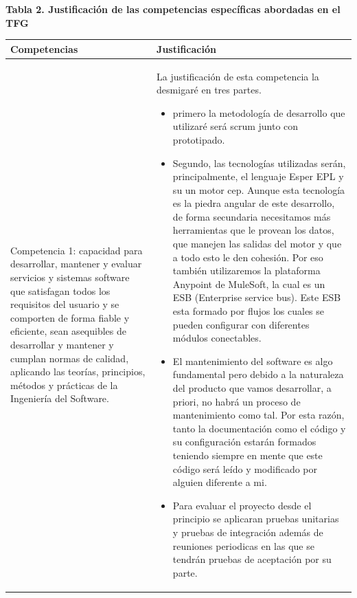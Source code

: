 \documentclass[a4paper]{article}
\begin{document}
\bigskip
{\centering\bfseries
Tabla 2. Justificaci\'on de las competencias espec\'ificas abordadas en el TFG
\par}
\begin{center}
  \begin{supertabular}{m{5.605cm}m{10.849cm}}

	{\color{black} \textbf{Competencias}} &
	{\color{black} \textbf{Justificaci\'on}}\\\hline
    
    {\color{black} Competencia 1: capacidad para desarrollar, mantener y evaluar servicios y sistemas software que satisfagan todos los requisitos del usuario y se comporten de forma fiable y eficiente, sean asequibles de desarrollar y mantener y cumplan normas de calidad, aplicando las teor\'ias, principios, m\'etodos y pr\'acticas de la Ingenier\'ia del Software.} &
    {\color{black} La justificación de esta competencia la desmigaré en tres partes.
    {\begin{itemize} 
    \item primero la metodología de desarrollo que utilizaré será scrum junto con prototipado.
    \item Segundo, las tecnologías utilizadas serán, principalmente, el lenguaje Esper EPL y su un motor cep. Aunque esta tecnología es la piedra angular de este desarrollo, de forma secundaria necesitamos más herramientas que le provean los datos, que manejen las salidas del motor y que a todo esto le den cohesión. Por eso también utilizaremos la plataforma Anypoint de MuleSoft, la cual es un ESB (Enterprise service bus). Este ESB esta formado por flujos los cuales se pueden configurar con diferentes módulos conectables.
    \item El mantenimiento del software es algo fundamental pero debido a la naturaleza del producto que vamos desarrollar, a priori, no habrá un proceso de mantenimiento como tal. Por esta razón, tanto la documentación como el código y su configuración estarán formados teniendo siempre en mente que este código será leído y modificado por alguien diferente a mi.
    \item Para evaluar el proyecto desde el principio se aplicaran pruebas unitarias y pruebas de integración además de reuniones periodicas en las que se tendrán pruebas de aceptación por su parte.
    \end{itemize}}
    }\\
    

\end{supertabular}
\end{center}
\end{document}
